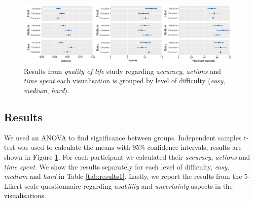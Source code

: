 \documentclass[final,5p,times,twocolumn,authoryear]{elsarticle}
\begin{document}
\begin{figure}
\includegraphics[width=\textwidth]{figures/study1CI.png}
\caption{ Results from \emph{quality of life} study regarding \emph{accuracy}, \emph{actions} and \emph{time spent} each visualisation is grouped by level of difficulty (\emph{easy}, \emph{medium}, \emph{hard}). }\label{study1CI}
\end{figure} 

\subsection{Results} %
\label{sec:evaluation}

We used an ANOVA to find significance between groups. Independent samples t-test was used to calculate the means with  95\% confidence intervals, results are shown in Figure \ref{study1CI}. For each participant we calculated their \emph{accuracy}, \emph{actions} and \emph{time spent}. We show the results separately for each level of difficulty, \emph{easy}, \emph{medium} and \emph{hard} in Table \ref{tab:results1}. Lastly, we report the results from the 5-Likert scale questionnaire regarding \emph{usability} and \emph{uncertainty} aspects in the visualisations.
\end{document}
